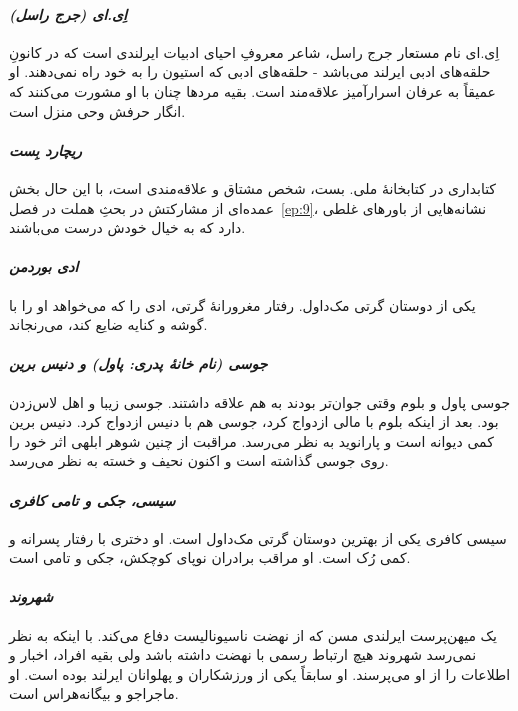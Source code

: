 \documentclass[12pt]{book}
\newcommand{\noun}[1]{\textit{\textcolor{black!70}{#1}}}
\begin{document}
    \paragraph{\noun{اِی.ای (جرج راسل)}\protect{}}
    اِی.ای نام مستعار جرج راسل، شاعر معروفِ احیای ادبیات ایرلندی است که در کانونِ حلقه‌های ادبی ایرلند می‌باشد - حلقه‌های ادبی که استیون را به خود راه نمی‌دهند. او عمیقاً به عرفان اسرارآمیز علاقه‌مند است. بقیه مردها چنان با او مشورت می‌کنند که انگار حرفش وحی منزل است.
    \paragraph{\noun{ریچارد بِست}\protect{}}
    کتابداری در کتابخانۀ ملی. بست، شخص مشتاق و علاقه‌مندی است، با این حال بخش عمده‌ای از مشارکتش در بحثِ هملت در فصل~\ref{ep:9}، نشانه‌هایی از باورهای غلطی دارد که به خیال خودش درست می‌باشند.
    \paragraph{\noun{ادی بوردمن}\protect{}}
    یکی از دوستان گرتی مک‌داول. رفتار مغرورانۀ گرتی، ادی را که می‌خواهد او را با گوشه و کنایه ضایع کند، می‌رنجاند.
    \paragraph{\noun{جوسی (نام خانۀ پدری: پاول) و دنیس برین}\protect{}}
    جوسی پاول و بلوم وقتی جوان‌تر بودند به هم علاقه داشتند. جوسی زیبا و اهل لاس‌زدن بود. بعد از اینکه بلوم با مالی ازدواج کرد، جوسی هم با دنیس ازدواج کرد. دنیس برین کمی دیوانه است و پارانوید به نظر می‌رسد. مراقبت از چنین شوهر ابلهی اثر خود را روی جوسی گذاشته است و اکنون نحیف و خسته به نظر می‌رسد.
    \paragraph{\noun{سیسی، جکی و تامی کافری}\protect{}}
    سیسی کافری یکی از بهترین دوستان گرتی مک‌داول است. او دختری با رفتار پسرانه و کمی رُک است. او مراقب برادران نوپای کوچکش، جکی و تامی است.
    \paragraph{\noun{شهروند}\protect{}}
    یک میهن‌پرست ایرلندی مسن که از نهضت ناسیونالیست دفاع می‌کند. با اینکه به نظر نمی‌رسد شهروند هیچ ارتباط رسمی با نهضت داشته باشد ولی بقیه افراد، اخبار و اطلاعات را از او می‌پرسند. او سابقاً یکی از ورزشکاران و پهلوانان ایرلند بوده است. او ماجراجو و بیگانه‌هراس است.
\end{document}

